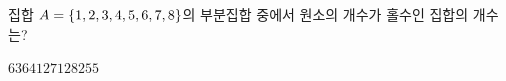 집합 $A=\{1{,}\mkern3mu\mathopen{}2{,}\mkern3mu\mathopen{}3{,}\mkern3mu\mathopen{}4{,}\mkern3mu\mathopen{}5{,}\mkern3mu\mathopen{}6{,}\mkern3mu\mathopen{}7{,}\mkern3mu\mathopen{}8\}$의 부분집합 중에서 원소의 개수가 홀수인 집합의 개수는?
\begin{choices32}{$63$}{$64$}{$127$}{$128$}{$255$}\end{choices32}
